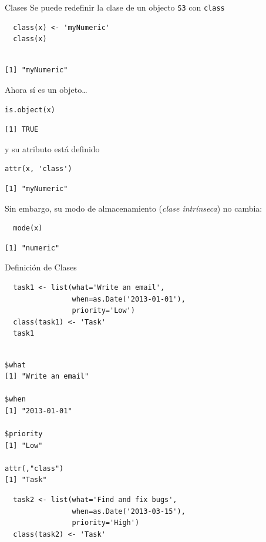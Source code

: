 \documentclass[xcolor={usenames,svgnames,dvipsnames}]{beamer}
\begin{document}
\begin{frame}[label={sec:org439c954},fragile]{Clases}
 Se puede redefinir la clase de un objecto \texttt{S3} con \texttt{class}
\lstset{language=r,label= ,caption= ,captionpos=b,numbers=none}
\begin{lstlisting}
  class(x) <- 'myNumeric'
  class(x)
\end{lstlisting}

\begin{verbatim}

[1] "myNumeric"
\end{verbatim}


Ahora sí es un objeto\ldots{} 
\lstset{language=r,label= ,caption= ,captionpos=b,numbers=none}
\begin{lstlisting}
is.object(x)
\end{lstlisting}

\begin{verbatim}
[1] TRUE
\end{verbatim}


y su atributo está definido
\lstset{language=r,label= ,caption= ,captionpos=b,numbers=none}
\begin{lstlisting}
attr(x, 'class')
\end{lstlisting}

\begin{verbatim}
[1] "myNumeric"
\end{verbatim}


Sin embargo, su modo de almacenamiento (\emph{clase intrínseca}) no cambia:
\lstset{language=r,label= ,caption= ,captionpos=b,numbers=none}
\begin{lstlisting}
  mode(x)
\end{lstlisting}

\begin{verbatim}
[1] "numeric"
\end{verbatim}
\end{frame}

\begin{frame}[label={sec:org8b2a811},fragile]{Definición de Clases}
 \lstset{language=r,label= ,caption= ,captionpos=b,numbers=none}
\begin{lstlisting}
  task1 <- list(what='Write an email',
                when=as.Date('2013-01-01'),
                priority='Low')
  class(task1) <- 'Task'
  task1
\end{lstlisting}

\begin{verbatim}

$what
[1] "Write an email"

$when
[1] "2013-01-01"

$priority
[1] "Low"

attr(,"class")
[1] "Task"
\end{verbatim}

\lstset{language=r,label= ,caption= ,captionpos=b,numbers=none}
\begin{lstlisting}
  task2 <- list(what='Find and fix bugs',
                when=as.Date('2013-03-15'),
                priority='High')
  class(task2) <- 'Task'
\end{lstlisting}
\end{frame}
\end{document}
